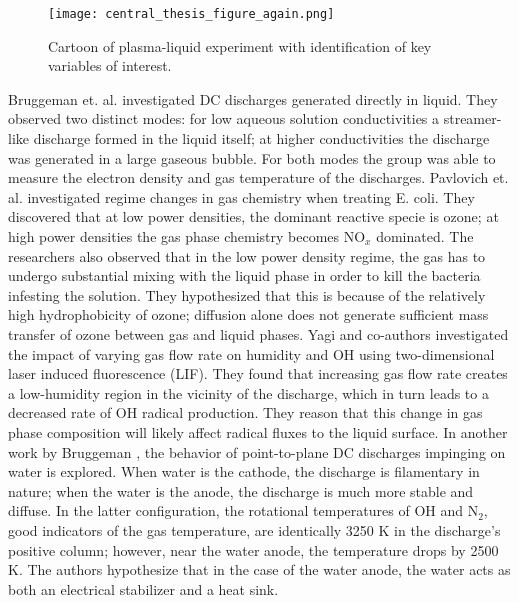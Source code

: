 \begin{figure}[htbp]
  \centering
  \texttt{[image: central\_thesis\_figure\_again.png]}
  \caption{Cartoon of plasma-liquid experiment with identification of key variables of interest.}
  \label{fig:central}
\end{figure}

Bruggeman et. al. \cite{Bruggeman2009d} investigated DC discharges generated directly in liquid. They observed two distinct modes: for low aqueous solution conductivities a streamer-like discharge formed in the liquid itself; at higher conductivities the discharge was generated in a large gaseous bubble. For both modes the group was able to measure the electron density and gas temperature of the discharges. Pavlovich et. al. \cite{Pavlovich2013g} investigated regime changes in gas chemistry when treating E. coli. They discovered that at low power densities, the dominant reactive specie is ozone; at high power densities the gas phase chemistry becomes NO$_x$ dominated. The researchers also observed that in the low power density regime, the gas has to undergo substantial mixing with the liquid phase in order to kill the bacteria infesting the solution. They hypothesized that this is because of the relatively high hydrophobicity of ozone; diffusion alone does not generate sufficient mass transfer of ozone between gas and liquid phases. Yagi and co-authors investigated the impact of varying gas flow rate on humidity and OH using two-dimensional laser induced fluorescence (LIF). \cite{yagi2015two} They found that increasing gas flow rate creates a low-humidity region in the vicinity of the discharge, which in turn leads to a decreased rate of OH radical production. They reason that this change in gas phase composition will likely affect radical fluxes to the liquid surface. In another work by Bruggeman \cite{bruggeman2008dc}, the behavior of point-to-plane DC discharges impinging on water is explored. When water is the cathode, the discharge is filamentary in nature; when the water is the anode, the discharge is much more stable and diffuse. In the latter configuration, the rotational temperatures of OH and N$_2$, good indicators of the gas temperature, are identically 3250 K in the discharge's positive column; however, near the water anode, the temperature drops by 2500 K. The authors hypothesize that in the case of the water anode, the water acts as both an electrical stabilizer and a heat sink.

